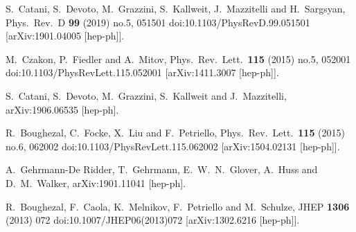   S.~Catani, S.~Devoto, M.~Grazzini, S.~Kallweit, J.~Mazzitelli and H.~Sargsyan,
  Phys.\ Rev.\ D {\bf 99} (2019) no.5,  051501
  doi:10.1103/PhysRevD.99.051501
  [arXiv:1901.04005 [hep-ph]].


  M.~Czakon, P.~Fiedler and A.~Mitov,
  Phys.\ Rev.\ Lett.\  {\bf 115} (2015) no.5,  052001
  doi:10.1103/PhysRevLett.115.052001
  [arXiv:1411.3007 [hep-ph]].

  S.~Catani, S.~Devoto, M.~Grazzini, S.~Kallweit and J.~Mazzitelli,
  arXiv:1906.06535 [hep-ph].

  R.~Boughezal, C.~Focke, X.~Liu and F.~Petriello,
  Phys.\ Rev.\ Lett.\  {\bf 115} (2015) no.6,  062002
  doi:10.1103/PhysRevLett.115.062002
  [arXiv:1504.02131 [hep-ph]].

  A.~Gehrmann-De Ridder, T.~Gehrmann, E.~W.~N.~Glover, A.~Huss and D.~M.~Walker,
  arXiv:1901.11041 [hep-ph].



  R.~Boughezal, F.~Caola, K.~Melnikov, F.~Petriello and M.~Schulze,
  JHEP {\bf 1306} (2013) 072
  doi:10.1007/JHEP06(2013)072
  [arXiv:1302.6216 [hep-ph]].

